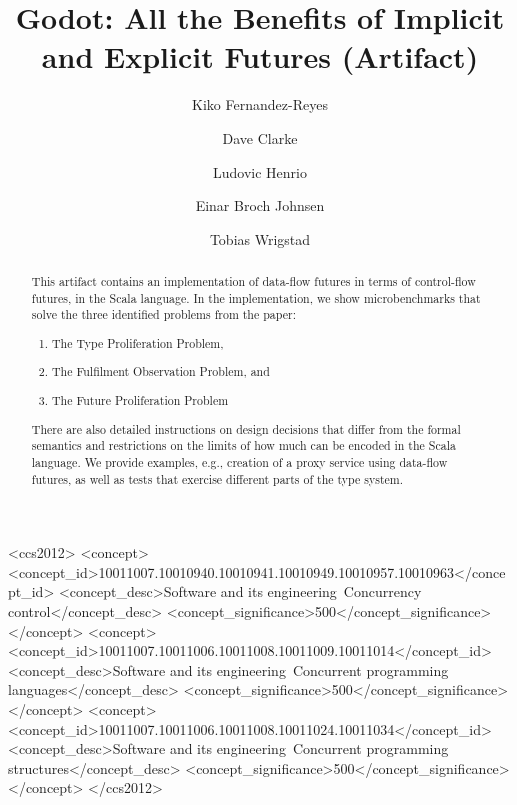 \documentclass[a4paper,UKenglish]{darts-v2019}
\title{Godot: All the Benefits of Implicit and Explicit Futures (Artifact)}
\author{Kiko Fernandez-Reyes}{Uppsala University, Sweden}{kiko.fernandez@it.uu.se}{https://orcid.org/0000-0001-8654-118X}{}
\author{Dave Clarke}{Storytel, Sweden}{}{https://orcid.org/0000-0002-1970-6607}{}
\author{Ludovic Henrio}{Univ Lyon, EnsL, UCBL, CNRS, Inria,  LIP, France}{ludovic.henrio@ens-lyon.fr}{https://orcid.org/0000-0001-7137-3523}{}
\author{Einar Broch Johnsen}{University of Oslo, Norway}{einarj@ifi.uio.no}{https://orcid.org/0000-0001-5382-3949}{}
\author{Tobias Wrigstad}{Uppsala University, Sweden}{tobias.wrigstad@it.uu.se}{https://orcid.org/0000-0002-4269-5408}{}
\begin{document}

\begin{CCSXML}
<ccs2012>
<concept>
<concept_id>10011007.10010940.10010941.10010949.10010957.10010963</concept_id>
<concept_desc>Software and its engineering~Concurrency control</concept_desc>
<concept_significance>500</concept_significance>
</concept>
<concept>
<concept_id>10011007.10011006.10011008.10011009.10011014</concept_id>
<concept_desc>Software and its engineering~Concurrent programming languages</concept_desc>
<concept_significance>500</concept_significance>
</concept>
<concept>
<concept_id>10011007.10011006.10011008.10011024.10011034</concept_id>
<concept_desc>Software and its engineering~Concurrent programming structures</concept_desc>
<concept_significance>500</concept_significance>
</concept>
</ccs2012>
\end{CCSXML}


  \maketitle

\begin{abstract}
This artifact contains an implementation of data-flow futures in terms of
control-flow futures, in the Scala language. In
the implementation, we show microbenchmarks that solve the three identified
problems from the paper:

\begin{enumerate}
\item The Type Proliferation Problem,
\item The Fulfilment Observation Problem, and
\item The Future Proliferation Problem
\end{enumerate}

There are also detailed instructions on design decisions that differ
from the formal semantics and restrictions on the limits of how much
can be encoded in the Scala language. We provide examples,
e.g., creation of a proxy service using data-flow futures,
as well as tests that exercise different parts of the type system.
 \end{abstract}
\end{document}
